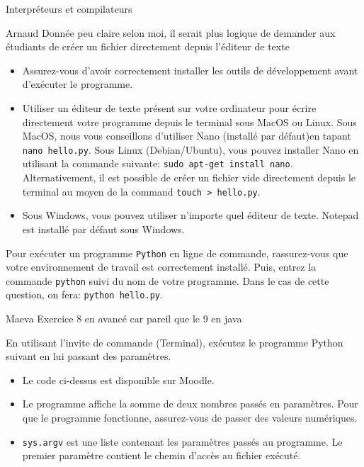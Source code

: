 \begin{section}{Interpréteurs et compilateurs}
\begin{note}{Arnaud}
    Donnée peu claire selon moi, il serait plus logique de demander aux étudiants de créer un fichier directement depuis l'éditeur de texte
    \end{note}
    \begin{conseil}
        \begin{itemize}
            \item Assurez-vous d'avoir correctement installer les outils de développement avant d'exécuter le programme.
            \item Utiliser un éditeur de texte présent sur votre ordinateur pour écrire directement votre programme depuis le terminal sous MacOS ou Linux. Sous MacOS, nous vous conseillons d'utiliser Nano (installé par défaut)en tapant \lstinline{nano hello.py}. Sous Linux (Debian/Ubuntu), vous pouvez installer Nano en utilisant la commande suivante: \lstinline{sudo apt-get install nano}.
Alternativement, il est possible de créer un fichier vide directement depuis le terminal au moyen de la command \lstinline{touch > hello.py}.
            \item Sous Windows, vous pouvez utiliser n'importe quel éditeur de texte. Notepad est installé par défaut sous Windows.
        \end{itemize}
    \end{conseil}
    \begin{solution}
        Pour exécuter un programme \lstinline{Python} en ligne de commande, rassurez-vous que votre environnement de travail est correctement installé. Puis, entrez la commande \lstinline{python} suivi du nom de votre programme. 
        Dans le cas de cette question, on fera: \lstinline{python hello.py}.
    \end{solution}
    
    \begin{note}{Maeva}
    Exercice 8 en avancé car pareil que le 9 en java 
\end{note}
    \begin{Exercice}[10 minutes]
        En utilisant l'invite de commande (Terminal), exécutez le programme Python suivant en lui passant des paramètres.

        
        
        \begin{conseil}
            \begin{itemize}
                \item Le code ci-dessus est disponible sur Moodle.
                \item Le programme affiche la somme de deux nombres passés en paramètres. Pour que le programme fonctionne, assurez-vous de passer des valeurs numériques.
                \item \lstinline{sys.argv} est une liste contenant les paramètres passés au programme. Le premier paramètre contient le chemin d'accès au fichier exécuté.
            \end{itemize}
        \end{conseil}


\end{Exercice}
\end{section}
